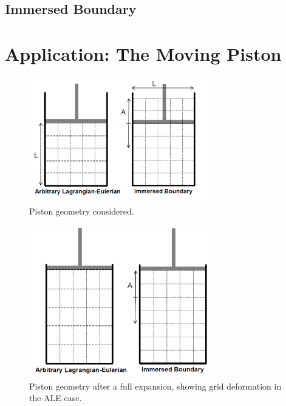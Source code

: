 \documentclass{article}
\begin{document}
\subsection{Immersed Boundary}



\section{Application: The Moving Piston}

\begin{figure}
  \centering
  \includegraphics[width=0.7\textwidth]{pistonbef.png}         
  \caption{Piston geometry considered.}
  \label{fig:pistonbef}
\end{figure}
\begin{figure}
  \centering
  \includegraphics[width=0.7\textwidth]{pistonaft.png}         
  \caption{Piston geometry after a full expansion, showing grid deformation in the ALE case.}
  \label{fig:pistonaft}
\end{figure}
\end{document}

